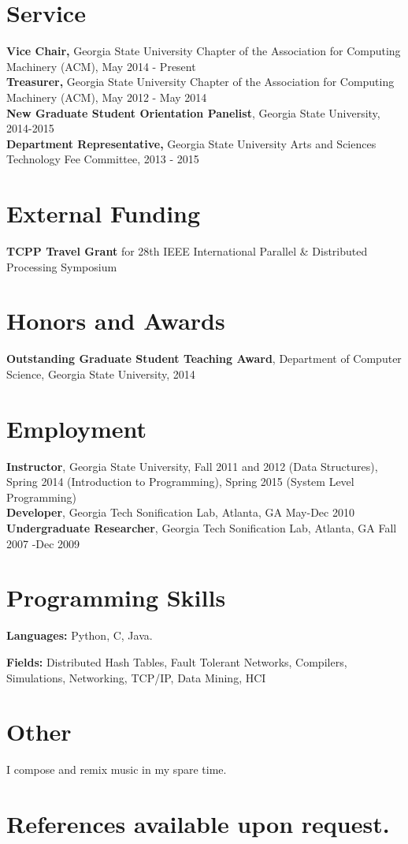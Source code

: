 \documentclass{res}
\begin{document}
\begin{resume}
\section{Service}
{\bf Vice Chair,} Georgia State University Chapter of the Association for Computing Machinery (ACM),  May 2014 - Present\\
{\bf Treasurer,} Georgia State University Chapter of the Association for Computing Machinery (ACM), May 2012 - May 2014\\
{\bf New Graduate Student Orientation Panelist}, Georgia State University, 2014-2015\\
{\bf Department Representative,} Georgia State University Arts and Sciences Technology Fee Committee, 2013 - 2015

\section{External Funding}
\textbf{TCPP Travel Grant} for 28th IEEE International Parallel \& Distributed Processing Symposium

\section{Honors and Awards}
\textbf{Outstanding Graduate Student Teaching Award}, Department of Computer Science, Georgia State University, 2014

\section{Employment}
{\bf Instructor}, Georgia State University, Fall 2011 and 2012 (Data Structures), Spring 2014 (Introduction to Programming), Spring 2015 (System Level Programming)\\
{\bf Developer}, Georgia Tech Sonification Lab, Atlanta, GA May-Dec 2010\\
{\bf Undergraduate Researcher}, Georgia Tech Sonification Lab, Atlanta, GA Fall 2007 -Dec 2009

\section{Programming Skills}
{\bf Languages:} Python, C, Java.

{\bf Fields:} Distributed Hash Tables, Fault Tolerant Networks, Compilers, Simulations, Networking, TCP/IP, Data Mining,  HCI


\section{Other}
I compose and remix music in my spare time.

\end{resume} 
\section{References available upon request.}
\end{document}
